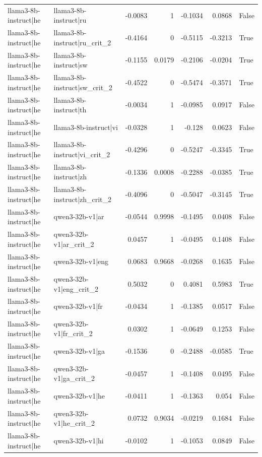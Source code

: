 \begin{table}
\begin{tabular}{l l r r r r l}
llama3-8b-instruct|he & llama3-8b-instruct|ru & -0.0083 & 1 & -0.1034 & 0.0868 & False \\
llama3-8b-instruct|he & llama3-8b-instruct|ru_crit_2 & -0.4164 & 0 & -0.5115 & -0.3213 & True \\
llama3-8b-instruct|he & llama3-8b-instruct|sw & -0.1155 & 0.0179 & -0.2106 & -0.0204 & True \\
llama3-8b-instruct|he & llama3-8b-instruct|sw_crit_2 & -0.4522 & 0 & -0.5474 & -0.3571 & True \\
llama3-8b-instruct|he & llama3-8b-instruct|th & -0.0034 & 1 & -0.0985 & 0.0917 & False \\
llama3-8b-instruct|he & llama3-8b-instruct|vi & -0.0328 & 1 & -0.128 & 0.0623 & False \\
llama3-8b-instruct|he & llama3-8b-instruct|vi_crit_2 & -0.4296 & 0 & -0.5247 & -0.3345 & True \\
llama3-8b-instruct|he & llama3-8b-instruct|zh & -0.1336 & 0.0008 & -0.2288 & -0.0385 & True \\
llama3-8b-instruct|he & llama3-8b-instruct|zh_crit_2 & -0.4096 & 0 & -0.5047 & -0.3145 & True \\
llama3-8b-instruct|he & qwen3-32b-v1|ar & -0.0544 & 0.9998 & -0.1495 & 0.0408 & False \\
llama3-8b-instruct|he & qwen3-32b-v1|ar_crit_2 & 0.0457 & 1 & -0.0495 & 0.1408 & False \\
llama3-8b-instruct|he & qwen3-32b-v1|eng & 0.0683 & 0.9668 & -0.0268 & 0.1635 & False \\
llama3-8b-instruct|he & qwen3-32b-v1|eng_crit_2 & 0.5032 & 0 & 0.4081 & 0.5983 & True \\
llama3-8b-instruct|he & qwen3-32b-v1|fr & -0.0434 & 1 & -0.1385 & 0.0517 & False \\
llama3-8b-instruct|he & qwen3-32b-v1|fr_crit_2 & 0.0302 & 1 & -0.0649 & 0.1253 & False \\
llama3-8b-instruct|he & qwen3-32b-v1|ga & -0.1536 & 0 & -0.2488 & -0.0585 & True \\
llama3-8b-instruct|he & qwen3-32b-v1|ga_crit_2 & -0.0457 & 1 & -0.1408 & 0.0495 & False \\
llama3-8b-instruct|he & qwen3-32b-v1|he & -0.0411 & 1 & -0.1363 & 0.054 & False \\
llama3-8b-instruct|he & qwen3-32b-v1|he_crit_2 & 0.0732 & 0.9034 & -0.0219 & 0.1684 & False \\
llama3-8b-instruct|he & qwen3-32b-v1|hi & -0.0102 & 1 & -0.1053 & 0.0849 & False \\

\end{tabular}
\end{table}
